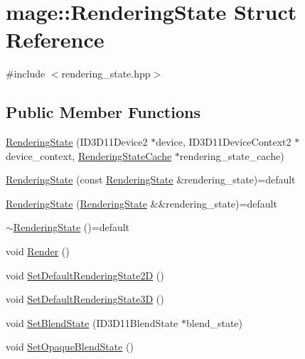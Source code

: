 \hypertarget{structmage_1_1_rendering_state}{}\section{mage\+:\+:Rendering\+State Struct Reference}
\label{structmage_1_1_rendering_state}


{\ttfamily \#include $<$rendering\+\_\+state.\+hpp$>$}

\subsection*{Public Member Functions}
\begin{DoxyCompactItemize}
\item 
\hyperlink{structmage_1_1_rendering_state_a6a1914effafb160ff1d05c8a1963278a}{Rendering\+State} (I\+D3\+D11\+Device2 $\ast$device, I\+D3\+D11\+Device\+Context2 $\ast$device\+\_\+context, \hyperlink{structmage_1_1_rendering_state_cache}{Rendering\+State\+Cache} $\ast$rendering\+\_\+state\+\_\+cache)
\item 
\hyperlink{structmage_1_1_rendering_state_ac5e435a581734fd62d8a5ce344c4a998}{Rendering\+State} (const \hyperlink{structmage_1_1_rendering_state}{Rendering\+State} \&rendering\+\_\+state)=default
\item 
\hyperlink{structmage_1_1_rendering_state_abea7eb2c63fd3b81a7c0940a2d70c78b}{Rendering\+State} (\hyperlink{structmage_1_1_rendering_state}{Rendering\+State} \&\&rendering\+\_\+state)=default
\item 
\hyperlink{structmage_1_1_rendering_state_a91f1168a2fab59b2a5d49082576d5d01}{$\sim$\+Rendering\+State} ()=default
\item 
void \hyperlink{structmage_1_1_rendering_state_a0a95ff66f5a136aceab2b7836c4d220c}{Render} ()
\item 
void \hyperlink{structmage_1_1_rendering_state_aa8279c1177941c8f14502fc9c7296655}{Set\+Default\+Rendering\+State2D} ()
\item 
void \hyperlink{structmage_1_1_rendering_state_ac6029d9fdc873317b97f60d59b88e7a7}{Set\+Default\+Rendering\+State3D} ()
\item 
void \hyperlink{structmage_1_1_rendering_state_a6f5c6b0bf031db9c3cf255356b4f383a}{Set\+Blend\+State} (I\+D3\+D11\+Blend\+State $\ast$blend\+\_\+state)
\item 
void \hyperlink{structmage_1_1_rendering_state_ab0f578405f3c880234757e152be1a670}{Set\+Opaque\+Blend\+State} ()
\item 

\end{DoxyCompactItemize}
